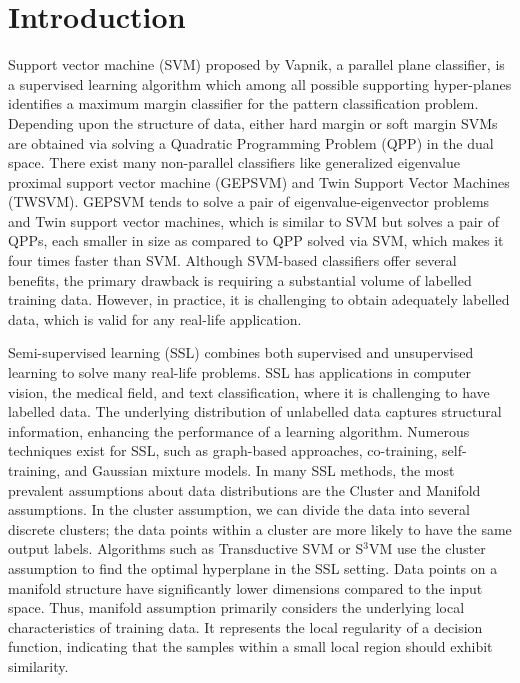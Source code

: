 \documentclass[12pt,a4paper,oneside,english]{report}
\begin{document}
\newpage
\tableofcontents




\newpage
\listoffigures
{}


\newpage
\listoftables







\newpage
{}
\chapter{Introduction}
Support vector machine (SVM) proposed by Vapnik\cite{cortes1995support}, a parallel plane classifier, is a supervised learning algorithm which among all possible supporting hyper-planes identifies a maximum margin classifier for the pattern classification problem. Depending upon the structure of data, either hard margin or soft margin SVMs are obtained via solving a Quadratic Programming Problem (QPP) in the dual space. There exist many non-parallel classifiers like generalized eigenvalue proximal support vector machine (GEPSVM)\cite{mangasarian2005multisurface} and Twin Support Vector Machines (TWSVM)\cite{khemchandani2007twin}.  GEPSVM tends to solve a pair of eigenvalue-eigenvector problems and Twin support vector machines\cite{khemchandani2007twin}, which is similar to SVM but solves a pair of QPPs, each smaller in size as compared to QPP solved via SVM, which makes it four times faster than  SVM. Although SVM-based classifiers offer several benefits, the primary drawback is requiring a substantial volume of labelled training data. However, in practice, it is challenging to obtain adequately labelled data, which is valid for any real-life application.

Semi-supervised learning (SSL) combines both supervised and unsupervised learning to solve many real-life problems. SSL has applications in computer vision, the medical field, and text classification, where it is challenging to have labelled data. The underlying distribution of unlabelled data captures structural information, enhancing the performance of a learning algorithm\cite{song2022graph}. Numerous techniques exist for SSL, such as graph-based approaches, co-training, self-training, and Gaussian mixture models. In many SSL methods, the most prevalent assumptions about data distributions are the Cluster and Manifold assumptions. In the cluster assumption, we can divide the data into several discrete clusters; the data points within a cluster are more likely to have the same output labels. Algorithms such as Transductive SVM\cite{joachims2003transductive} or S\(^3\)VM \cite{bennett1998semi} use the cluster assumption to find the optimal hyperplane in the SSL setting. Data points on a manifold structure have significantly lower dimensions compared to the input space\cite{izenman2012introduction}. Thus, manifold assumption primarily considers the underlying local characteristics of training data. It represents the local regularity of a decision function, indicating that the samples within a small local region should exhibit similarity.  
\end{document}
